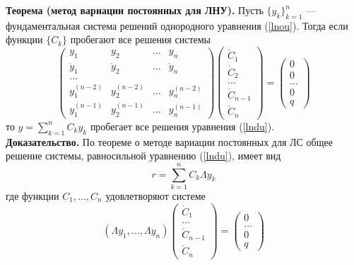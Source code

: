 \documentclass{article}
\begin{document}
\noindent \textbf{Теорема (метод вариации постоянных для ЛНУ).} Пусть $\{y_k\}_{k=1}^n$ --- фундаментальная система решений однородного уравнения (\ref{lnou}). Тогда если функции $\{C_k\}$ пробегают все решения системы
\begin{equation*}
    \begin{pmatrix}
    y_1 & y_2 & \ldots & y_n\\
    \dot{y}_1 & \dot{y}_2 & \ldots & \dot{y}_n\\
    \ldots\\
    y_1^{(n-2)} & y_2^{(n-2)} & \ldots & y_n^{(n-2)}\\
    y_1^{(n-1)} & y_2^{(n-1)} & \ldots & y_n^{(n-1)}
    \end{pmatrix}
    \begin{pmatrix}
    \dot{C}_{1}\\
    \dot{C}_{2}\\
    \ldots\\
    \dot{C}_{n-1}\\
    \dot{C}_{n}
    \end{pmatrix}
    =
    \begin{pmatrix}
    0\\
    0\\
    \ldots\\
    0\\
    q
    \end{pmatrix}
\end{equation*}
то $y = \displaystyle\sum_{k = 1}^n C_ky_k$ пробегает все решения уравнения (\ref{lndu}).\\

\noindent \textbf{Доказательство.} По теореме о методе вариации постоянных для ЛС общее решение системы, равносильной уравнению (\ref{lndu}), имеет вид
\begin{equation*}
    r = \sum_{k=1}^n C_k \Lambda y_k
\end{equation*}
где функции $C_1, \ldots, C_n$ удовлетворяют системе
\begin{equation*}
    (\Lambda y_1, \ldots, \Lambda y_n)
    \begin{pmatrix}
    \dot{C}_{1}\\
    \ldots\\
    \dot{C}_{n-1}\\
    \dot{C}_{n}
    \end{pmatrix}
    =
    \begin{pmatrix}
    0\\
    \ldots\\
    0\\
    q
    \end{pmatrix}
\end{equation*}
\end{document}
